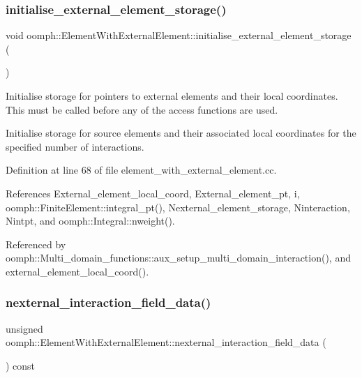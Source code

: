 \subsubsection{\texorpdfstring{initialise\+\_\+external\+\_\+element\+\_\+storage()}{initialise\_external\_element\_storage()}}
{\footnotesize\ttfamily void oomph\+::\+Element\+With\+External\+Element\+::initialise\+\_\+external\+\_\+element\+\_\+storage (\begin{DoxyParamCaption}{ }\end{DoxyParamCaption})}



Initialise storage for pointers to external elements and their local coordinates. This must be called before any of the access functions are used. 

Initialise storage for source elements and their associated local coordinates for the specified number of interactions. 

Definition at line 68 of file element\+\_\+with\+\_\+external\+\_\+element.\+cc.



References External\+\_\+element\+\_\+local\+\_\+coord, External\+\_\+element\+\_\+pt, i, oomph\+::\+Finite\+Element\+::integral\+\_\+pt(), Nexternal\+\_\+element\+\_\+storage, Ninteraction, Nintpt, and oomph\+::\+Integral\+::nweight().



Referenced by oomph\+::\+Multi\+\_\+domain\+\_\+functions\+::aux\+\_\+setup\+\_\+multi\+\_\+domain\+\_\+interaction(), and external\+\_\+element\+\_\+local\+\_\+coord().

\mbox{\label{classoomph_1_1ElementWithExternalElement_a4b36dae007dc177425c50f30211890de}} 
\subsubsection{\texorpdfstring{nexternal\+\_\+interaction\+\_\+field\+\_\+data()}{nexternal\_interaction\_field\_data()}}
{\footnotesize\ttfamily unsigned oomph\+::\+Element\+With\+External\+Element\+::nexternal\+\_\+interaction\+\_\+field\+\_\+data (\begin{DoxyParamCaption}{ }\end{DoxyParamCaption}) const\hspace{0.3cm}{\ttfamily [inline]}}



